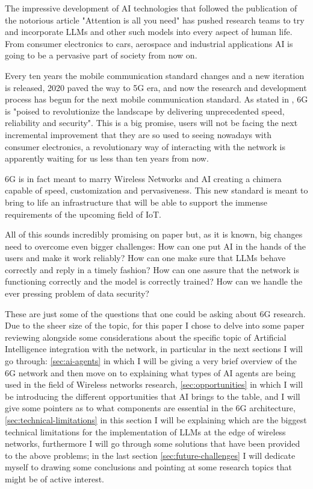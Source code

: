 

The impressive development of AI technologies that followed the publication of the notorious article
"Attention is all you need"\cite{attention} has pushed research teams to try and incorporate LLMs
and other such models into every aspect of human life. From consumer electronics to cars, aerospace
and industrial applications AI is going to be a pervasive part of society from now on.

Every ten years the mobile communication standard changes and a new iteration is released, 2020
paved the way to 5G era, and now the research and development process has begun for the next mobile communication standard.
As stated in \cite{6ainets}, 6G is "poised to revolutionize the landscape by delivering
unprecedented speed, reliability and security". This is a big promise, users will not be facing the
next incremental improvement that they are so used to seeing nowadays with consumer electronics,
a revolutionary way of interacting with the network is apparently waiting for us less than ten years
from now.

6G is in fact meant to marry Wireless Networks and AI creating a chimera capable of speed,
customization and pervasiveness. This new standard is meant to bring to life an infrastructure that
will be able to support the immense requirements of the upcoming field of IoT.

\bigskip

All of this sounds incredibly promising on paper but, as it is known, big changes need to overcome even
bigger challenges: How can one put AI in the hands of the users and make it work reliably? How can
one make sure that LLMs behave correctly and reply in a timely fashion? How can one
assure that the network is functioning correctly and the model is correctly trained? How can we
handle the ever pressing problem of data security?

These are just some of the questions that one could be asking about 6G research. Due to the sheer size of the topic, for this
paper I chose to delve into some paper reviewing alongside some considerations about the specific
topic of Artificial Intelligence integration with the network, in particular in the next sections I
will go through: \ref{sec:ai-agents} in which I will be giving a very brief
overview of the 6G network and then move on to explaining what types
of AI agents are being used in the field of Wireless networks research, \ref{sec:opportunities} in
which I will be introducing the different opportunities that AI brings to the table, and I will
give some pointers as to what components are essential in the 6G architecture, \ref{sec:technical-limitations} in this section I will be explaining which are the biggest technical limitations for the implementation of LLMs at the edge of wireless networks, furthermore I will go through some solutions that have been provided to the above problems; in the last section \ref{sec:future-challenges} I will dedicate myself to drawing some
conclusions and pointing at some research topics that might be of active interest.
